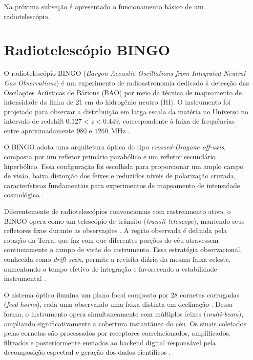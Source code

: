 Na próxima subseção é apresentado o funcionamento básico de um radiotelescópio.


\section{Radiotelescópio BINGO}

O radiotelescópio BINGO (\textit{Baryon Acoustic Oscillations from Integrated Neutral Gas Observations}) é um experimento de radioastronomia dedicado à detecção das Oscilações Acústicas de Bárions (BAO) por meio da técnica de mapeamento de intensidade da linha de 21 cm do hidrogênio neutro (HI). O instrumento foi projetado para observar a distribuição em larga escala da matéria no Universo no intervalo de redshift \(0.127 < z < 0.449\), correspondente à faixa de frequências entre aproximadamente \(980\) e \(1260,\mathrm{MHz}\) \cite{abdalla2022bingoI,wuensche2022bingoII}.

O BINGO adota uma arquitetura óptica do tipo \textit{crossed-Dragone off-axis}, composta por um refletor primário parabólico e um refletor secundário hiperbólico. Essa configuração foi escolhida para proporcionar um amplo campo de visão, baixa distorção dos feixes e reduzidos níveis de polarização cruzada, características fundamentais para experimentos de mapeamento de intensidade cosmológica \cite{wuensche2022bingoII}.

Diferentemente de radiotelescópios convencionais com rastreamento ativo, o BINGO opera como um telescópio de trânsito (\textit{transit telescope}), mantendo seus refletores fixos durante as observações \cite{abdalla2022bingoI}. A região observada é definida pela rotação da Terra, que faz com que diferentes porções do céu atravessem continuamente o campo de visão do instrumento. Essa estratégia observacional, conhecida como \textit{drift scan}, permite a revisita diária da mesma faixa celeste, aumentando o tempo efetivo de integração e favorecendo a estabilidade instrumental \cite{wuensche2022bingoII}.

O sistema óptico ilumina um plano focal composto por 28 cornetas corrugadas (\textit{feed horns}), cada uma observando uma faixa distinta em declinação \cite{abdalla2022bingoI}. Dessa forma, o instrumento opera simultaneamente com múltiplos feixes (\textit{multi-beam}), ampliando significativamente a cobertura instantânea do céu. Os sinais coletados pelas cornetas são processados por receptores correlacionados, amplificados, filtrados e posteriormente enviados ao backend digital responsável pela decomposição espectral e geração dos dados científicos \cite{wuensche2022bingoII}.

